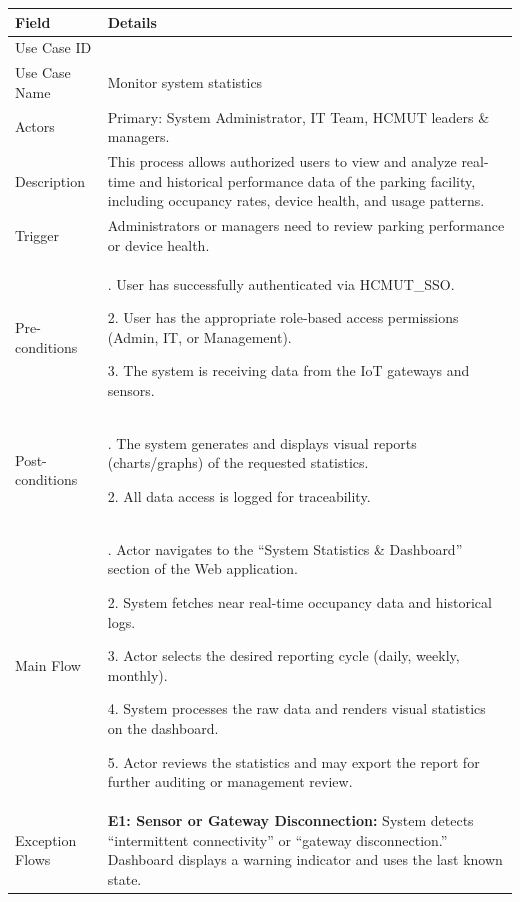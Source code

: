 \begin{table}[H]
\small
\renewcommand{\arraystretch}{1.4}
\begin{tabularx}{\textwidth}{|>{\raggedright\arraybackslash}p{3.5cm}|>{\RaggedRight\arraybackslash}X|}
\hline
\rowcolor{gray!20} \textbf{Field} & \textbf{Details} \\
\hline
Use Case ID & 4.5 \\
\hline
Use Case Name & Monitor system statistics \\
\hline
Actors & Primary: System Administrator, IT Team, HCMUT leaders \& managers. \\
\hline
Description & This process allows authorized users to view and analyze real-time and historical performance data of the parking facility, including occupancy rates, device health, and usage patterns. \\
\hline
Trigger & Administrators or managers need to review parking performance or device health. \\
\hline
Pre-conditions & 1. User has successfully authenticated via HCMUT\_SSO. \par 2. User has the appropriate role-based access permissions (Admin, IT, or Management). \par 3. The system is receiving data from the IoT gateways and sensors. \\
\hline
Post-conditions & 1. The system generates and displays visual reports (charts/graphs) of the requested statistics. \par 2. All data access is logged for traceability. \\
\hline
Main Flow & 
1. Actor navigates to the ``System Statistics \& Dashboard'' section of the Web application. \par
2. System fetches near real-time occupancy data and historical logs. \par
3. Actor selects the desired reporting cycle (daily, weekly, monthly). \par
4. System processes the raw data and renders visual statistics on the dashboard. \par
5. Actor reviews the statistics and may export the report for further auditing or management review. \\
\hline
Exception Flows & 
\textbf{E1: Sensor or Gateway Disconnection:} System detects ``intermittent connectivity'' or ``gateway disconnection.'' Dashboard displays a warning indicator and uses the last known state. \par \vspace{0.5em}

\end{tabularx}
\end{table}
